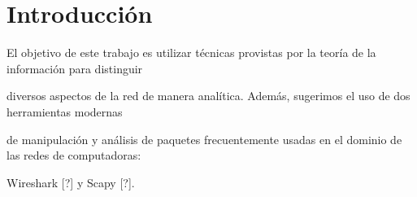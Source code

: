 \section{Introducción}

El objetivo de este trabajo es utilizar técnicas provistas por la teoría de la información para distinguir

diversos aspectos de la red de manera analítica. Además, sugerimos el uso de dos herramientas modernas

de manipulación y análisis de paquetes frecuentemente usadas en el dominio de las redes de computadoras:

Wireshark [?] y Scapy [?].